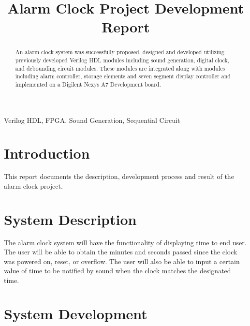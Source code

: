 \documentclass[conference]{IEEEtran}
\begin{document}
\title{Alarm Clock Project Development Report\\
}

\author{
}

\maketitle

\begin{abstract}
    An alarm clock system was successfully proposed, designed and developed utilizing previously developed Verilog HDL modules including sound generation, digital clock, and debounding circuit modules. These modules are integrated along with modules including alarm controller, storage elements and seven segment display controller and implemented on a Digilent Nexys A7 Development board.
\end{abstract}

\begin{IEEEkeywords}
Verilog HDL, FPGA, Sound Generation, Sequential Circuit
\end{IEEEkeywords}

\section{Introduction}
This report documents the description, development process and result of the alarm clock project.

\section{System Description}
The alarm clock system will have the functionality of displaying time to end user. The user will be 
able to obtain the minutes and seconds passed since the clock was powered on, reset, or overflow. 
The user will also be able to input a certain value of time to be notified by sound when the clock 
matches the designated time.

\section{System Development}
\end{document}
